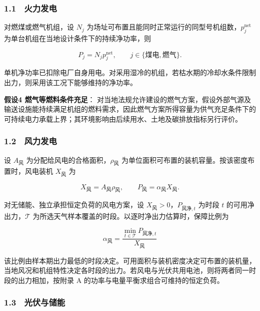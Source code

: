\subsubsection{1.1　火力发电}

对燃煤或燃气机组，设 $N_j$ 为场址可布置且能同时正常运行的同型号机组数，$p_j^{\mathrm{net}}$ 为单台机组在当地设计条件下的持续净功率，则

\begin{equation}
P_j=N_jp_j^{\mathrm{net}}, \qquad j\in\{\text{煤电},\text{燃气}\}.
\tag{3}
\end{equation}

单机净功率已扣除电厂自身用电。对采用湿冷的机组，若枯水期的冷却水条件限制出力，则采用该工况下能够维持的净功率\cite{q1ref02}。

\begin{asum}
\textbf{假设4 燃气等燃料条件充足}： 对当地法规允许建设的燃气方案，假设外部气源及输送设施能持续满足机组的燃料需求，因此燃气方案所得容量为供气充足条件下的可持续电力承载上界；其环境影响由后续用水、土地及碳排放指标另行评价。
\end{asum}

\subsubsection{1.2　风力发电}

设 $A_{\text{风}}$ 为分配给风电的合格面积，$\rho_{\text{风}}$ 为单位面积可布置的装机容量。按该密度布置时，风电装机 $X_{\text{风}}$ 为

\begin{equation}
X_{\text{风}}=A_{\text{风}}\rho_{\text{风}}, \qquad P_{\text{风}}=\alpha_{\text{风}}X_{\text{风}}.
\tag{4}
\end{equation}

对无储能、独立承担恒定负荷的风电方案，设 $X_{\text{风}} > 0$，$P_{\text{风净},t}$ 为时段 $t$ 的可用净出力，$\mathcal T$ 为所选天气样本覆盖的时段。以逐时净出力估算时，保障比例为

\[
\alpha_{\text{风}}=\frac{\min_{t\in\mathcal T}P_{\text{风净},t}}{X_{\text{风}}}
\]

该比例由样本期出力最低的时段决定。可用面积与装机密度决定可布置的装机量，当地风况和机组特性决定各时段的出力\cite{q1ref03}。若风电与光伏共用电池，则将两者同一时段的出力相加，按附录 A 的功率与电量平衡求组合可维持的恒定负荷。

\subsubsection{1.3　光伏与储能}

